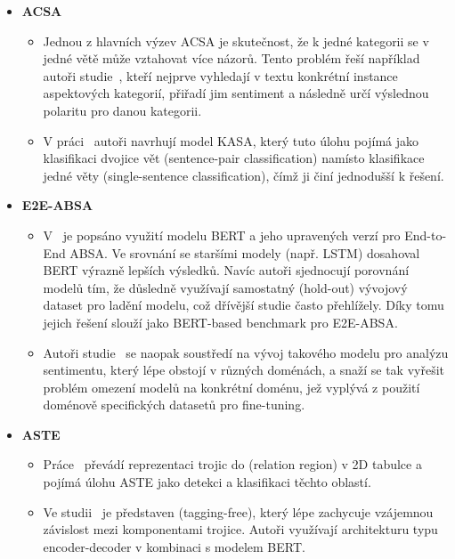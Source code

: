 \begin{itemize}
    \item \textbf{ACSA}
    \begin{itemize}
        \item Jednou z hlavních výzev ACSA je skutečnost, že k jedné kategorii se v jedné větě může vztahovat více názorů. Tento problém řeší například autoři studie~\cite{li2020multiinstancemultilabellearningnetworks}, kteří nejprve vyhledají v textu konkrétní instance aspektových kategorií, přiřadí jim sentiment a následně určí výslednou polaritu pro danou kategorii. 
        
        \item V práci~\cite{LIU2023110339} autoři navrhují model KASA, který tuto úlohu pojímá jako klasifikaci dvojice vět (sentence-pair classification) namísto klasifikace jedné věty (single-sentence classification), čímž ji činí jednodušší k řešení.
    \end{itemize}

    \item \textbf{E2E-ABSA}
    \begin{itemize}
        \item V~\cite{li-etal-2019-exploiting} je popsáno využití modelu BERT a jeho upravených verzí pro End-to-End ABSA. Ve srovnání se staršími modely (např. LSTM) dosahoval BERT výrazně lepších výsledků. Navíc autoři sjednocují porovnání modelů tím, že důsledně využívají samostatný (hold-out) vývojový dataset pro ladění modelu, což dřívější studie často přehlížely. Díky tomu jejich řešení slouží jako BERT-based benchmark pro E2E-ABSA.
    
        \item Autoři studie~\cite{toledo-ronen-etal-2022-multi} se naopak soustředí na vývoj takového modelu pro analýzu sentimentu, který lépe obstojí v různých doménách, a snaží se tak vyřešit problém omezení modelů na konkrétní doménu, jež vyplývá z použití doménově specifických datasetů pro fine-tuning.
    \end{itemize}

    \item \textbf{ASTE}
    \begin{itemize}
        \item Práce~\cite{zhang-etal-2022-boundary} převádí reprezentaci trojic do  (relation region) v 2D tabulce a pojímá úlohu ASTE jako detekci a klasifikaci těchto oblastí.
        \item Ve studii~\cite{mukherjee-etal-2021-paste} je představen  (tagging-free), který lépe zachycuje vzájemnou závislost mezi komponentami trojice. Autoři využívají architekturu typu encoder-decoder v kombinaci s modelem BERT.
    \end{itemize}


\end{itemize}
